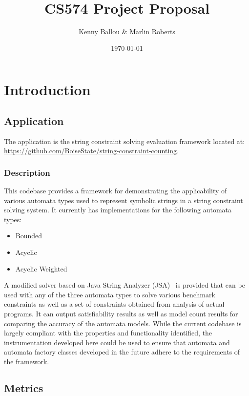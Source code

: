 \documentclass[letterpaper,11pt]{article}
\title{CS574 Project Proposal}
\date{\today}
\author{Kenny Ballou \& Marlin Roberts}
\begin{document}
\maketitle{}
\tableofcontents{}

\section{Introduction}

\subsection{Application}

The application is the string constraint solving evaluation framework located
at: \url{https://github.com/BoiseState/string-constraint-counting}.

\subsubsection{Description}

This codebase provides a framework for demonstrating the applicability of
various automata types used to represent symbolic strings in a string
constraint solving system.  It currently has implementations for the following
automata types:

\begin{itemize}
\item{Bounded}
\item{Acyclic}
\item{Acyclic Weighted}
\end{itemize}

A modified solver based on Java String Analyzer (JSA)~\cite{strings2003} is
provided that can be used with any of the three automata types to solve various
benchmark constraints as well as a set of constraints obtained from analysis of
actual programs. It can output satisfiability results as well as model count
results for comparing the accuracy of the automata models.  While the current
codebase is largely compliant with the properties and functionality identified,
the instrumentation developed here could be used to ensure that automata and
automata factory classes developed in the future adhere to the requirements of
the framework.

\subsection{Metrics}
\end{document}
